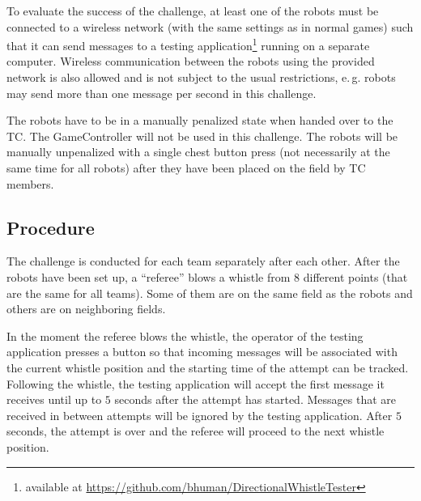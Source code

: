 \documentclass[12pt]{article}
\newcommand{\eg}{\mbox{e.\,g.}\xspace}
\begin{document}
To evaluate the success of the challenge, at least one of the robots must be connected to a wireless network (with the same settings as in normal games) such that it can send messages to a testing application\footnote{available at \url{https://github.com/bhuman/DirectionalWhistleTester}} running on a separate computer. Wireless communication between the robots using the provided network is also allowed and is not subject to the usual restrictions, \eg robots may send more than one message per second in this challenge.

The robots have to be in a manually penalized state when handed over to the TC. The GameController will not be used in this challenge. The robots will be manually unpenalized with a single chest button press (not necessarily at the same time for all robots) after they have been placed on the field by TC members.

\subsection{Procedure}
\label{sec:dwc:procedure}
The challenge is conducted for each team separately after each other. After the robots have been set up, a ``referee'' blows a whistle from \(8\) different points (that are the same for all teams). Some of them are on the same field as the robots and others are on neighboring fields.

In the moment the referee blows the whistle, the operator of the testing application presses a button so that incoming messages will be associated with the current whistle position and the starting time of the attempt can be tracked. Following the whistle, the testing application will accept the first message it receives until up to \(5\) seconds after the attempt has started. Messages that are received in between attempts will be ignored by the testing application. After \(5\) seconds, the attempt is over and the referee will proceed to the next whistle position.
\end{document}
